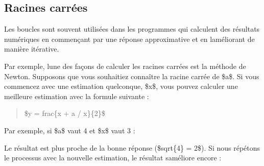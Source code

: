 \hypertarget{racines-carruxe9es}{%
\subsection{Racines carrées}\label{racines-carruxe9es}}

Les boucles sont souvent utilisées dans les programmes qui calculent des
résultats numériques en commençant par une réponse approximative et en
l\textquotesingle améliorant de manière itérative.

Par exemple, l\textquotesingle une des façons de calculer les racines
carrées est la méthode de Newton. Supposons que vous souhaitiez
connaître la racine carrée de \$a\$. Si vous commencez avec une
estimation quelconque, \$x\$, vous pouvez calculer une meilleure
estimation avec la formule suivante :

\begin{quote}
\$y = frac\{x + a / x\}\{2\}\$
\end{quote}

Par exemple, si \$a\$ vaut 4 et \$x\$ vaut 3 :

\begin{Shaded}
\begin{Highlighting}[]
\OperatorTok{\textgreater{}\textgreater{}\textgreater{}}\OperatorTok{=} 
\OperatorTok{\textgreater{}\textgreater{}\textgreater{}}\OperatorTok{=} 
\OperatorTok{\textgreater{}\textgreater{}\textgreater{}}\OperatorTok{=}\OperatorTok{+}\OperatorTok{/}\OperatorTok{/} 
\OperatorTok{\textgreater{}\textgreater{}\textgreater{}}
\end{Highlighting}
\end{Shaded}

Le résultat est plus proche de la bonne réponse (\$sqrt\{4\} = 2\$). Si
nous répétons le processus avec la nouvelle estimation, le résultat
s\textquotesingle améliore encore :

\begin{Shaded}
\begin{Highlighting}[]
\OperatorTok{\textgreater{}\textgreater{}\textgreater{}}\OperatorTok{=}
\OperatorTok{\textgreater{}\textgreater{}\textgreater{}}\OperatorTok{=}\OperatorTok{+}\OperatorTok{/}\OperatorTok{/} 
\OperatorTok{\textgreater{}\textgreater{}\textgreater{}}
\end{Highlighting}
\end{Shaded}


